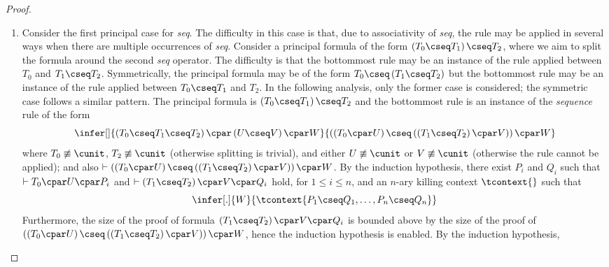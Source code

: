 \documentclass[UKenglish,acmsmall,authorversion]{acmart}
\theoremstyle{plain}
\begin{document}
{\begin{proof}
\begin{enumerate}[label=\textbf{\Alph*},ref=\Alph*,leftmargin=*]
\begin{enumerate}[label*=\textbf{.\arabic*}]
\item Consider the first principal case for \textit{seq}.
The difficulty in this case is that, due to associativity of \textit{seq}, the \rseq rule may be applied in several ways when there are multiple occurrences of \textit{seq}.
Consider a principal formula of the form $\left(T_0 \cseq T_1\right) \cseq T_2$, where we aim to split the formula around the second \textit{seq} operator. The difficulty is that the bottommost rule may be an instance of the \rseq rule applied between $T_0$ and $T_1 \cseq T_2$. Symmetrically, the principal formula may be of the form $T_0 \cseq \left(T_1 \cseq T_2\right)$ but the bottommost rule may be an instance of the \rseq rule applied between $T_0 \cseq T_1$ and $T_2$.
In the following analysis, only the former case is considered; the symmetric case follows a similar pattern.
The principal formula is $\left(T_0 \cseq T_1\right) \cseq T_2$ and the bottommost rule is an instance of the \textit{sequence} rule of the form
\[
\infer[]{
\left( T_0 \cseq T_1 \cseq T_2 \right) \cpar \left( U \cseq V \right) \cpar W
}{
\left(\left( T_0 \cpar U \right) \cseq \left( \left(T_1 \cseq T_2\right) \cpar V \right)\right) \cpar W
}
\] 
where $T_0 \not\equiv \cunit$, $T_2 \not\equiv \cunit$ (otherwise splitting is trivial), and either $U \not\equiv \cunit$ or $V \not\equiv \cunit$ (otherwise the \rseq rule cannot be applied);
and also $\vdash \left(\left( T_0 \cpar U \right) \cseq \left( \left(T_1 \cseq T_2\right) \cpar V \right)\right) \cpar W$.
By the induction hypothesis, %
there exist $P_i$ and $Q_i$ such that $\vdash T_0 \cpar U \cpar P_i$ and $\vdash \left(T_1 \cseq T_2\right) \cpar V \cpar Q_i$ hold, for $1 \leq i \leq n$, and an $n$-ary killing context $\tcontext{}$ such that 
\[
\infer[.]{W}{
\tcontext{ P_1 \cseq Q_1, \hdots, P_n \cseq Q_n }
}
\]
Furthermore,
the size of the proof of formula
$
\left(T_1 \cseq T_2\right) \cpar V \cpar Q_i
$
is bounded above by the size of the proof of
$\left(\left( T_0 \cpar U \right) \cseq \left( \left(T_1 \cseq T_2\right) \cpar V \right)\right) \cpar W$, hence the induction hypothesis is enabled.
%
By the induction hypothesis, %

\end{enumerate}
\end{enumerate}
\end{proof}}
\end{document}
